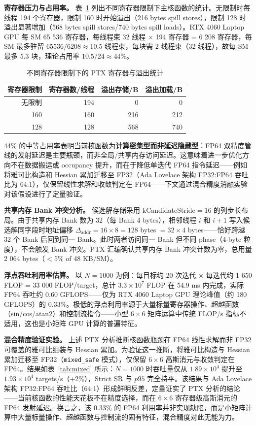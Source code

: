 \documentclass[twocolumn,a4paper,10pt]{ctexart}
\begin{document}
\textbf{寄存器压力与占用率。} 表~\ref{tab:regs} 列出不同寄存器限制下主核函数的统计。无限制时每线程 194 个寄存器，限制 160 时开始溢出（216 bytes spill stores），限制 128 时溢出显著增加（568 bytes spill stores/740 bytes spill loads）。RTX 4060 Laptop GPU 每 SM 65 536 寄存器，每线程束 32 线程 $\times$ 194 寄存器 = 6 208 寄存器，每 SM 最多驻留 $65536/6208\approx10.5$ 线程束，每块需 2 线程束（32 线程），故每 SM 最多 5.3 块，理论占用率 $10.5/24\approx44\%$。

\begin{table}[htbp]
\centering
\caption{不同寄存器限制下的 PTX 寄存器与溢出统计}
\label{tab:regs}
\small
\begin{tabular}{rrrr}
\toprule
寄存器限制 & 寄存器数/线程 & 溢出存储/B & 溢出加载/B\\
\midrule
无限制 & 194 & 0 & 0\\
160 & 160 & 216 & 212\\
128 & 128 & 568 & 740\\
\bottomrule
\end{tabular}
\end{table}

44\% 的中等占用率表明当前核函数为\textbf{计算密集型而非延迟隐藏型}：FP64 双精度管线的发射延迟是主要瓶颈，而非全局/共享内存访问延迟。这意味着进一步优化方向不在数据搬运或 occupancy 提升，而在于降低单迭代 FP64 指令延迟——例如将雅可比构造和 Hessian 累加迁移至 FP32（Ada Lovelace 架构 FP32:FP64 吞吐比为 64:1\cite{cuda}），仅保留线性求解和收敛判定在 FP64——下文通过混合精度消融实验对该假设进行了定量验证。

\textbf{共享内存 Bank 冲突分析。} 候选解存储采用 kCandidateStride$=16$ 的列步长布局。由于共享内存 Bank 数为 32（每 Bank 4 bytes），相邻线程 $i$ 和 $i+1$ 写入候选解同字段时地址偏移 $\Delta_{\mathrm{addr}}=16\times8=128$ bytes $=32\times4$ bytes——恰好跨越 32 个 Bank 后回到同一 Bank。此时两者访问同一 Bank 但不同 phase（4-byte 粒度），不会触发 Bank 冲突。PTX 汇编确认共享内存 Bank 冲突计数为零\cite{cuda-best-practices}，总用量 2 064 bytes（$<5\%$ of 48 KB/SM）。

\textbf{浮点吞吐利用率估算。} 以 $N=1000$ 为例：每目标约 20 次迭代 $\times$ 每迭代约 1 650 FLOP = 33 000 FLOP/target，总计 $3.3\times10^7$ FLOP 在 54.9 ms 内完成，实际 FP64 吞吐约 0.60 GFLOPS——仅为 RTX 4060 Laptop GPU 理论峰值（约 180 GFLOPS）的 0.33\%。极低的浮点利用率源于大量标量寄存器操作、超越函数（sin/cos/atan2）和控制流指令——小型 $6\times6$ 矩阵运算中传统 FLOP/s 指标不适用，这也是小矩阵 GPU 计算的普遍特征。

\textbf{混合精度验证实验。} 上述 PTX 分析推断核函数瓶颈在 FP64 线性求解而非 FP32 可覆盖的雅可比组装与 Hessian 累加。为验证这一推断，将雅可比构造与 Hessian 累加迁移至 FP32（\texttt{mixed\_safe} 模式），仅保留 $6\times6$ 高斯消元与收敛判定在 FP64。结果如表~\ref{tab:mixed} 所示：$N=1000$ 时吞吐量仅从 $1.89\times10^4$ 提升至 $1.93\times10^4$ targets/s（+2\%），Strict SR 与 $p95$ 完全持平。该结果与 Ada Lovelace 架构 FP32:FP64 吞吐比（64:1）形成鲜明反差，定量证实了 PTX 分析的结论——当前核函数的性能天花板不在精度选择，而在 $6\times6$ 寄存器级高斯消元的 FP64 发射延迟。换言之，该 0.33\% 的 FP64 利用率并非实现缺陷，而是小矩阵计算中大量标量操作、超越函数与控制流的固有特征，混合精度对此无能为力。
\end{document}
